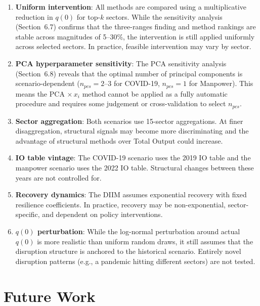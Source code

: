 \begin{enumerate}
    \item \textbf{Uniform intervention}: All methods are compared using a multiplicative reduction in $q(0)$ for top-$k$ sectors. While the sensitivity analysis (Section~6.7) confirms that the three-ranges finding and method rankings are stable across magnitudes of 5--30\%, the intervention is still applied uniformly across selected sectors. In practice, feasible intervention may vary by sector.

    \item \textbf{PCA hyperparameter sensitivity}: The PCA sensitivity analysis (Section~6.8) reveals that the optimal number of principal components is scenario-dependent ($n_{\textit{pcs}} = 2$--$3$ for COVID-19, $n_{\textit{pcs}} = 1$ for Manpower). This means the PCA $\times\, x_i$ method cannot be applied as a fully automatic procedure and requires some judgement or cross-validation to select $n_{\textit{pcs}}$.

    \item \textbf{Sector aggregation}: Both scenarios use 15-sector aggregations. At finer disaggregation, structural signals may become more discriminating and the advantage of structural methods over Total Output could increase.

    \item \textbf{IO table vintage}: The COVID-19 scenario uses the 2019 IO table and the manpower scenario uses the 2022 IO table. Structural changes between these years are not controlled for.

    \item \textbf{Recovery dynamics}: The DIIM assumes exponential recovery with fixed resilience coefficients. In practice, recovery may be non-exponential, sector-specific, and dependent on policy interventions.

    \item \textbf{$q(0)$ perturbation}: While the log-normal perturbation around actual $q(0)$ is more realistic than uniform random draws, it still assumes that the disruption structure is anchored to the historical scenario. Entirely novel disruption patterns (e.g., a pandemic hitting different sectors) are not tested.
\end{enumerate}


\section{Future Work}

